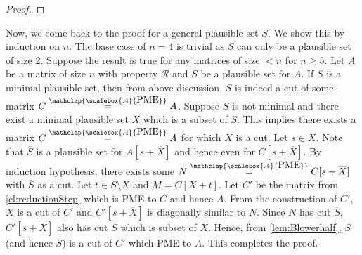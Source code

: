 \documentclass[11pt,letterpaper]{article}
\newcommand{\comp}[1]{\overline{#1}}
\newtheorem{lemma}{Lemma}[section]
\newcommand{\PME}{\stackrel{\mathclap{\scalebox{.4}{\mbox{PME}}}}{=}}
\newcommand{\prop}{\mathcal{R}}
\begin{document}
{{{\begin{proof}
\end{proof}

Now, we come back to the proof for a general plausible set $S$. We show this by induction on $n$. The base case of $n=4$ is trivial as $S$ can only be a plausible set of size 2. Suppose the result is true for any matrices of size $<n$ for $n\geq 5$. Let $A$
be a matrix of size $n$ with property $\prop$ and $S$ be a plausible set for $A$. If $S$ is a minimal plausible set, then from above discussion, $S$ is indeed a cut of some matrix $C\PME A$. Suppose $S$ is not minimal and there exist a minimal plausible set $X$ which is a subset of $S$. This implies there exists a matrix $C\PME A$ for which $X$ is a cut. Let $s\in X$. Note that $\comp{S}$ is a plausible set for $A[s+\comp{X}]$ and hence even for $C[s+\comp{X}]$. By induction hypothesis, there exists some $N\PME C[s+\comp{X}]$ with $\comp{S}$ as a cut. Let $t\in S \setminus X$ and $M=C[X+t]$.  Let $C'$ be the matrix from \cref{cl:reductionStep} which is PME to $C$ and hence $A$. From the construction of $C'$, $X$ is a cut of $C'$ and $C'[s+\comp{X}]$ is diagonally similar to $N$. Since $N$ has cut $\comp{S}$, $C'[s+\comp{X}]$ also has cut $\comp{S}$ which is subset of $\comp{X}$. Hence, from \cref{lem:Blowerhalf}, $\comp{S}$ (and hence $S$) is a cut of $C'$ which PME to $A$. This completes the proof.

}}}
\end{document}
